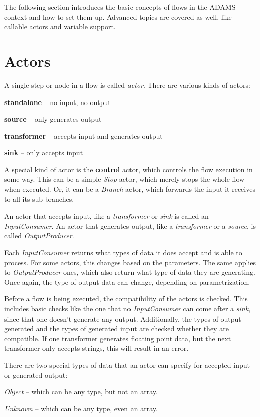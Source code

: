 The following section introduces the basic concepts of flows in the ADAMS
context and how to set them up. Advanced topics are covered as well, like
callable actors and variable support.

\section{Actors}
A single step or node in a flow is called \textit{actor}. There are various
kinds of actors:
\begin{tight_itemize}
  \item \textbf{standalone} -- no input, no output
  \item \textbf{source} -- only generates output
  \item \textbf{transformer} -- accepts input and generates output
  \item \textbf{sink} -- only accepts input
\end{tight_itemize}
A special kind of actor is the \textbf{control} actor, which controls the flow
execution in some way. This can be a simple \textit{Stop} actor, which merely
stops the whole flow when executed. Or, it can be a \textit{Branch} actor, which
forwards the input it receives to all its sub-branches.

An actor that accepts input, like a \textit{transformer} or \textit{sink} is
called an \textit{InputConsumer}. An actor that generates output, like
a \textit{transformer} or a \textit{source}, is called \textit{OutputProducer}.

Each \textit{InputConsumer} returns what types of data it does accept and is
able to process. For some actors, this changes based on the parameters. The same
applies to \textit{OutputProducer} ones, which also return what type of data
they are generating. Once again, the type of output data can change, depending
on parametrization.

Before a flow is being executed, the compatibility of the actors is
checked. This includes basic checks like the one that no \textit{InputConsumer}
can come after a \textit{sink}, since that one doesn't generate any output.
Additionally, the types of output generated and the types of generated input are
checked whether they are compatible. If one transformer generates floating
point data, but the next transformer only accepts strings, this will result in
an error.

There are two special types of data that an actor can specify for accepted input
or generated output:
\begin{tight_itemize}
  \item \textit{Object} -- which can be any type, but not an array.
  \item \textit{Unknown} -- which can be any type, even an array.
\end{tight_itemize}

